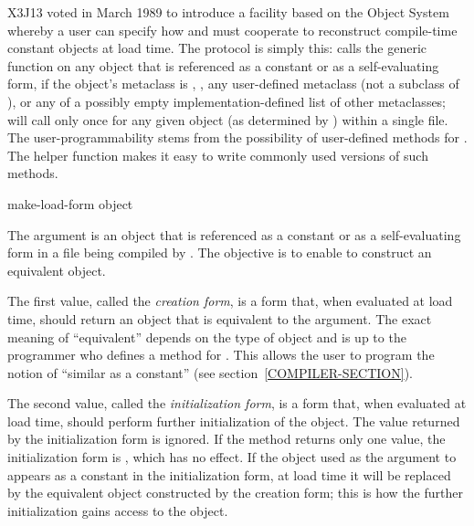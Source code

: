 \begin{newer}
X3J13 voted in March 1989  to introduce a facility
based on the Object System
whereby a user can specify how  and 
must cooperate to reconstruct compile-time constant objects at load time.
The protocol is simply this:
   calls the generic
  function  on any object that is referenced as
  a constant or as a self-evaluating form, if the object's metaclass is
  , , any user-defined metaclass (not a
  subclass of ), or any of a possibly empty
  implementation-defined list of other metaclasses;  will
  call  only once for any given object (as determined by )
  within a single file.  The user-programmability stems from the possibility
  of user-defined methods for .  The helper function
   makes it easy to write commonly used
  versions of such methods.

\begin{defun}
make-load-form object

The argument is an object that is
  referenced as a constant or as a self-evaluating form in a file being
  compiled by .  The objective is to enable  to
  construct an equivalent object.

  The first value, called the {\it creation form}, is a form that, when
  evaluated at load time, should return an object that is equivalent to
  the argument.  The exact meaning of ``equivalent'' depends on the type
  of object and is up to the programmer who defines a method for
  .  This allows the user to program the notion
  of ``similar as a constant'' (see section~\ref{COMPILER-SECTION}).

  The second value, called the {\it initialization form}, is a form that,
  when evaluated at load time, should perform further initialization of
  the object.  The value returned by the initialization form is ignored.
  If the  method returns only one value, the
  initialization form is , which has no effect.  If the object used
  as the argument to  appears as a constant in the
  initialization form, at load time it will be replaced by the
  equivalent object constructed by the creation form; this is how the
  further initialization gains access to the object.


\end{defun}
\end{newer}
